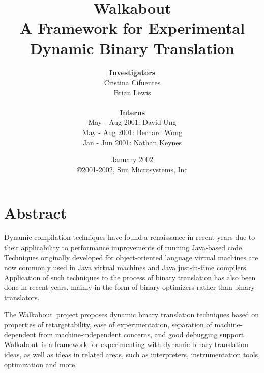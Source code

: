 \documentclass[11pt,letter]{book}
\newcommand{\walk}{Walkabout}
\begin{document}
\title{\Large \bf Walkabout \\ A Framework for Experimental Dynamic 
	Binary Translation}
\author{
{\bf Investigators} \\
	Cristina Cifuentes \\
	Brian Lewis \\ \\
{\bf Interns} \\
	May - Aug 2001: David Ung \\
	May - Aug 2001: Bernard Wong \\
	Jan - Jun 2001: Nathan Keynes 
}
\date{
	January 2002 \\ 
    \copyright 2001-2002, Sun Microsystems, Inc }
\maketitle


\section*{Abstract}

Dynamic compilation techniques have found a renaissance in recent  
years due to their applicability to performance improvements 
of running Java-based code. 
Techniques originally developed for object-oriented language virtual 
machines are now commonly used in Java virtual machines and Java 
just-in-time compilers. 
Application of such techniques to the process of binary translation 
has also been done in recent years, mainly in the form of 
binary optimizers rather than binary translators. 

The \walk\ project proposes dynamic binary translation techniques 
based on properties of retargetability, ease of experimentation, 
separation of machine-dependent from machine-independent concerns, 
and good debugging support.  
\walk\ is a framework for experimenting with dynamic binary
translation ideas, as well as ideas in related areas, such as 
interpreters, instrumentation tools, optimization and more. 




{
\tableofcontents
\listoffigures

	






\appendix

}{

	
}




\end{document}
